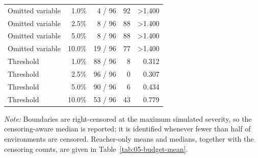 \begin{table}[htbp]
{\begin{tabular}{@{}lrrrr@{}}
\addlinespace
Omitted variable & 1.0\% & 4 / 96 & 92 & >1.400 \\
Omitted variable & 2.5\% & 8 / 96 & 88 & >1.400 \\
Omitted variable & 5.0\% & 8 / 96 & 88 & >1.400 \\
Omitted variable & 10.0\% & 19 / 96 & 77 & >1.400 \\
\addlinespace
Threshold & 1.0\% & 88 / 96 & 8 & 0.312 \\
Threshold & 2.5\% & 96 / 96 & 0 & 0.307 \\
Threshold & 5.0\% & 90 / 96 & 6 & 0.434 \\
Threshold & 10.0\% & 53 / 96 & 43 & 0.779 \\
\bottomrule
\end{tabular}%
}
\par\smallskip
\begin{minipage}{0.96\linewidth}
\footnotesize
\textit{Note:} Boundaries are right-censored at the maximum simulated severity, so the censoring-aware median is reported; it is identified whenever fewer than half of environments are censored. Reacher-only means and medians, together with the censoring counts, are given in Table~\ref{tab:05-budget-mean}.
\end{minipage}
\end{table}
